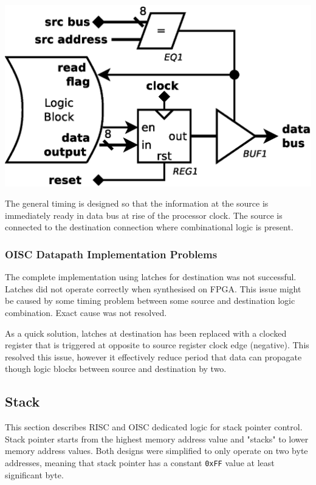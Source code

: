 \begin{colfigure}
	\centering
	\includegraphics[width=\linewidth]{../resources/oisc_cell_out.eps}
	\label{fig:oisc_cell_out}
\end{colfigure}

The general timing is designed so that the information at the source is immediately ready in data bus at rise of the processor clock. The source is connected to the destination connection where combinational logic is present. 

\subsubsection{OISC Datapath Implementation Problems} \label{subsec:oisc_cell_issue}

The complete implementation using latches for destination was not successful. Latches did not operate correctly when synthesised on FPGA. This issue might be caused by some timing problem between some source and destination logic combination. Exact cause was not resolved.

As a quick solution, latches at destination has been replaced with a clocked register that is triggered at opposite to source register clock edge (negative). This resolved this issue, however it effectively reduce period that data can propagate though logic blocks between source and destination by two.

\subsection{Stack} \label{subsec:stack}
This section describes RISC and OISC dedicated logic for stack pointer control. Stack pointer starts from the highest memory address value and "stacks" to lower memory address values. Both designs were simplified to only operate on two byte addresses, meaning that stack pointer has a constant \texttt{0xFF} value at least significant byte. 


